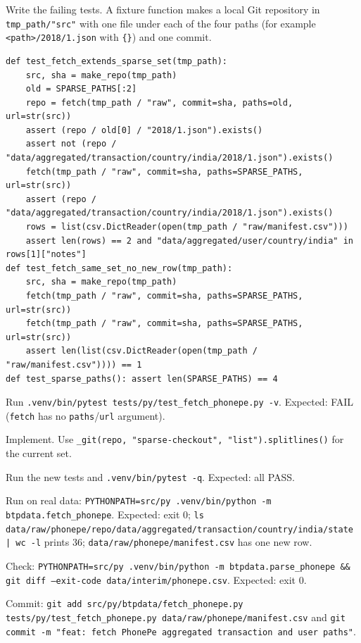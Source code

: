 \documentclass[10pt,a4paper]{article}
\newcommand{\f}[1]{\texttt{#1}}
\begin{document}
\begin{steps}
\item Write the failing tests. A fixture function makes a local Git repository in \f{tmp\_path/"src"} with one
      file under each of the four paths (for example \f{<path>/2018/1.json} with \f{\{\}}) and one commit.
\begin{verbatim}
def test_fetch_extends_sparse_set(tmp_path):
    src, sha = make_repo(tmp_path)
    old = SPARSE_PATHS[:2]
    repo = fetch(tmp_path / "raw", commit=sha, paths=old, url=str(src))
    assert (repo / old[0] / "2018/1.json").exists()
    assert not (repo / "data/aggregated/transaction/country/india/2018/1.json").exists()
    fetch(tmp_path / "raw", commit=sha, paths=SPARSE_PATHS, url=str(src))
    assert (repo / "data/aggregated/transaction/country/india/2018/1.json").exists()
    rows = list(csv.DictReader(open(tmp_path / "raw/manifest.csv")))
    assert len(rows) == 2 and "data/aggregated/user/country/india" in rows[1]["notes"]
def test_fetch_same_set_no_new_row(tmp_path):
    src, sha = make_repo(tmp_path)
    fetch(tmp_path / "raw", commit=sha, paths=SPARSE_PATHS, url=str(src))
    fetch(tmp_path / "raw", commit=sha, paths=SPARSE_PATHS, url=str(src))
    assert len(list(csv.DictReader(open(tmp_path / "raw/manifest.csv")))) == 1
def test_sparse_paths(): assert len(SPARSE_PATHS) == 4
\end{verbatim}
\item Run \f{.venv/bin/pytest tests/py/test\_fetch\_phonepe.py -v}. Expected: FAIL (\f{fetch} has no
      \f{paths}/\f{url} argument).
\item Implement. Use \f{\_git(repo, "sparse-checkout", "list").splitlines()} for the current set.
\item Run the new tests and \f{.venv/bin/pytest -q}. Expected: all PASS.
\item Run on real data: \f{PYTHONPATH=src/py .venv/bin/python -m btpdata.fetch\_phonepe}. Expected: exit 0;
      \f{ls data/raw/phonepe/repo/data/aggregated/transaction/country/india/state | wc -l} prints 36;
      \f{data/raw/phonepe/manifest.csv} has one new row.
\item Check: \f{PYTHONPATH=src/py .venv/bin/python -m btpdata.parse\_phonepe \&\& git diff --exit-code data/interim/phonepe.csv}.
      Expected: exit 0.
\item Commit: \f{git add src/py/btpdata/fetch\_phonepe.py tests/py/test\_fetch\_phonepe.py data/raw/phonepe/manifest.csv}
      and \f{git commit -m "feat: fetch PhonePe aggregated transaction and user paths"}.
\end{steps}
\end{document}
